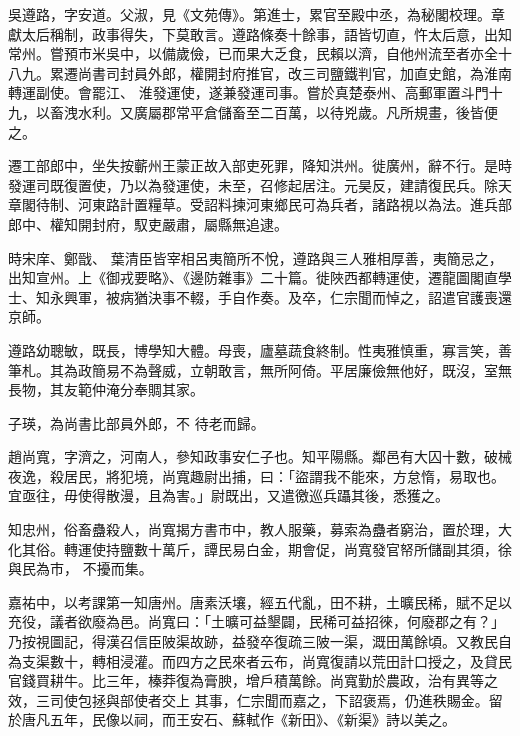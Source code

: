\begin{pinyinscope}
 吳遵路，字安道。父淑，見《文苑傳》。第進士，累官至殿中丞，為秘閣校理。章獻太后稱制，政事得失，下莫敢言。遵路條奏十餘事，語皆切直，忤太后意，出知常州。嘗預市米吳中，以備歲儉，已而果大乏食，民賴以濟，自他州流至者亦全十八九。累遷尚書司封員外郎，權開封府推官，改三司鹽鐵判官，加直史館，為淮南轉運副使。會罷江、
 淮發運使，遂兼發運司事。嘗於真楚泰州、高郵軍置斗門十九，以畜洩水利。又廣屬郡常平倉儲畜至二百萬，以待兇歲。凡所規畫，後皆便之。



 遷工部郎中，坐失按蘄州王蒙正故入部吏死罪，降知洪州。徙廣州，辭不行。是時發運司既復置使，乃以為發運使，未至，召修起居注。元昊反，建請復民兵。除天章閣待制、河東路計置糧草。受詔料揀河東鄉民可為兵者，諸路視以為法。進兵部郎中、權知開封府，馭吏嚴肅，屬縣無追逮。



 時宋庠、鄭戩、
 葉清臣皆宰相呂夷簡所不悅，遵路與三人雅相厚善，夷簡忌之，出知宣州。上《御戎要略》、《邊防雜事》二十篇。徙陜西都轉運使，遷龍圖閣直學士、知永興軍，被病猶決事不輟，手自作奏。及卒，仁宗聞而悼之，詔遣官護喪還京師。



 遵路幼聰敏，既長，博學知大體。母喪，廬墓蔬食終制。性夷雅慎重，寡言笑，善筆札。其為政簡易不為聲威，立朝敢言，無所阿倚。平居廉儉無他好，既沒，室無長物，其友範仲淹分奉賙其家。



 子瑛，為尚書比部員外郎，不
 待老而歸。



 趙尚寬，字濟之，河南人，參知政事安仁子也。知平陽縣。鄰邑有大囚十數，破械夜逸，殺居民，將犯境，尚寬趣尉出捕，曰：「盜謂我不能來，方怠惰，易取也。宜亟往，毋使得散漫，且為害。」尉既出，又遣徼巡兵躡其後，悉獲之。



 知忠州，俗畜蠱殺人，尚寬揭方書市中，教人服藥，募索為蠱者窮治，置於理，大化其俗。轉運使持鹽數十萬斤，譚民易白金，期會促，尚寬發官帑所儲副其須，徐與民為市，
 不擾而集。



 嘉祐中，以考課第一知唐州。唐素沃壤，經五代亂，田不耕，土曠民稀，賦不足以充役，議者欲廢為邑。尚寬曰：「土曠可益墾闢，民稀可益招徠，何廢郡之有？」乃按視圖記，得漢召信臣陂渠故跡，益發卒復疏三陂一渠，溉田萬餘頃。又教民自為支渠數十，轉相浸灌。而四方之民來者云布，尚寬復請以荒田計口授之，及貸民官錢買耕牛。比三年，榛莽復為膏腴，增戶積萬餘。尚寬勤於農政，治有異等之效，三司使包拯與部使者交上
 其事，仁宗聞而嘉之，下詔褒焉，仍進秩賜金。留於唐凡五年，民像以祠，而王安石、蘇軾作《新田》、《新渠》詩以美之。




\end{pinyinscope}
